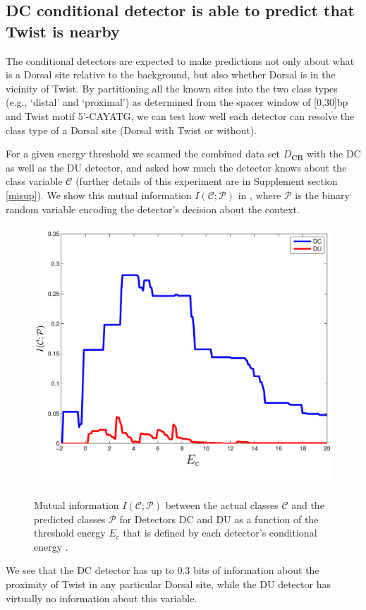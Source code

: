\subsection* {DC conditional detector is able to predict that Twist is nearby} 
The conditional detectors are expected to make predictions not only about what is a Dorsal site relative to the background, but also whether Dorsal is in the vicinity of Twist.  By partitioning all the known sites into the two class types (e.g., `distal' and `proximal') as determined from the spacer window of [0,30]bp and Twist motif 5'-CAYATG, we can test how well each detector can resolve the class type of a Dorsal site (Dorsal with Twist or without).  

For a given energy threshold we scanned the combined data set $D_{\textbf{CB}}$ with the DC as well as the DU detector, and asked how much the detector knows about the class variable $\mathcal C$ (further details of this experiment are in Supplement section \ref{misup}).  We show this mutual information $I(\mathcal C;\mathcal P)$ in  , where $\mathcal P$ is the binary random variable encoding the detector's decision about the context. 
\begin{figure}
  \includegraphics[width=6in]{miclasses-new.pdf}\\
  \caption{Mutual information $I(\mathcal C;\mathcal P)$ between the actual classes $\mathcal C$ and the predicted classes $\mathcal P$ for Detectors DC and DU as a function of the threshold energy $E_c$ that is defined by each detector's conditional energy .
    \label{MiSP}}
\end{figure}
We see that the DC detector has up to 0.3 bits of information about the proximity of Twist in any particular Dorsal site, while the DU detector has virtually no information about this variable. 

